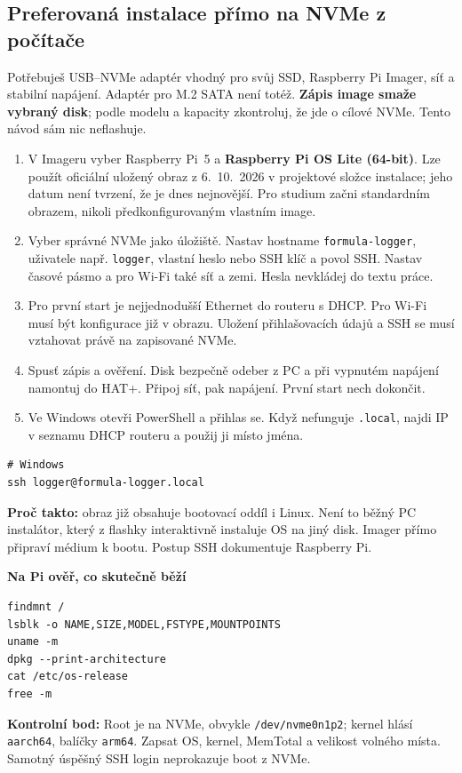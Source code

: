 \documentclass[11pt,a4paper]{article}
\newcommand{\krok}[1]{\par\noindent\textbf{#1}\par}
\newcommand{\kontrola}[1]{\par\noindent\textbf{Kontrolní bod:} #1\par}
\begin{document}
\subsection{Preferovaná instalace přímo na NVMe z počítače}
Potřebuješ USB--NVMe adaptér vhodný pro svůj SSD, Raspberry Pi Imager, síť a stabilní napájení. Adaptér pro M.2 SATA není totéž. \textbf{Zápis image smaže vybraný disk}; podle modelu a kapacity zkontroluj, že jde o cílové NVMe. Tento návod sám nic neflashuje.\cite{pi-start,pi-hat}
\begin{enumerate}
\item V Imageru vyber Raspberry Pi~5 a \textbf{Raspberry Pi OS Lite (64-bit)}. Lze použít oficiální uložený obraz z 6.~10.~2026 v projektové složce instalace; jeho datum není tvrzení, že je dnes nejnovější. Pro studium začni standardním obrazem, nikoli předkonfigurovaným vlastním image.
\item Vyber správné NVMe jako úložiště. Nastav hostname \texttt{formula-logger}, uživatele např. \texttt{logger}, vlastní heslo nebo SSH klíč a povol SSH. Nastav časové pásmo a pro Wi-Fi také síť a zemi. Hesla nevkládej do textu práce.
\item Pro první start je nejjednodušší Ethernet do routeru s DHCP. Pro Wi-Fi musí být konfigurace již v obrazu. Uložení přihlašovacích údajů a SSH se musí vztahovat právě na zapisované NVMe.
\item Spusť zápis a ověření. Disk bezpečně odeber z PC a při vypnutém napájení namontuj do HAT+. Připoj síť, pak napájení. První start nech dokončit.
\item Ve Windows otevři PowerShell a přihlas se. Když nefunguje \texttt{.local}, najdi IP v seznamu DHCP routeru a použij ji místo jména.
\end{enumerate}
\begin{lstlisting}
# Windows
ssh logger@formula-logger.local
\end{lstlisting}
\textbf{Proč takto:} obraz již obsahuje bootovací oddíl i Linux. Není to běžný PC instalátor, který z flashky interaktivně instaluje OS na jiný disk. Imager přímo připraví médium k bootu. Postup SSH dokumentuje Raspberry Pi.\cite{pi-remote}

\krok{Na Pi ověř, co skutečně běží}
\begin{lstlisting}
findmnt /
lsblk -o NAME,SIZE,MODEL,FSTYPE,MOUNTPOINTS
uname -m
dpkg --print-architecture
cat /etc/os-release
free -m
\end{lstlisting}
\kontrola{Root je na NVMe, obvykle \texttt{/dev/nvme0n1p2}; kernel hlásí \texttt{aarch64}, balíčky \texttt{arm64}. Zapsat OS, kernel, MemTotal a velikost volného místa. Samotný úspěšný SSH login neprokazuje boot z NVMe.}
\end{document}
